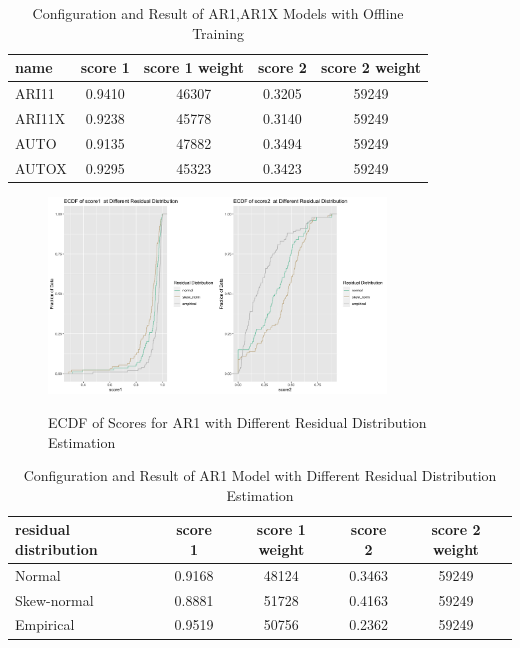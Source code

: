 \documentclass{article}
\begin{document}
\begin{table}[htbp]
  \begin{center}
    \caption{Configuration and Result of AR1,AR1X Models with Offline Training}
    \label{tab:tab1.3.2}
    \begin{tabular}{l|*{4}{c}}
      \textbf{name} & \textbf{score 1} & \textbf{score 1 weight} & \textbf{score 2} & \textbf{score 2 weight} \\
      \hline
      ARI11 & 0.9410 & 46307 & 0.3205 & 59249\\
      ARI11X & 0.9238 & 45778 & 0.3140 & 59249\\
      AUTO & 0.9135 & 47882 & 0.3494 & 59249\\
      AUTOX & 0.9295 & 45323 & 0.3423 & 59249\\
    \end{tabular}
  \end{center}
\end{table}

\begin{figure}[htbp]
\caption{ECDF of Scores for AR1 with Different Residual Distribution Estimation}
\centering
\includegraphics[width = 0.8\textwidth]{images/ECDFofscoresatDifferentResidualDistributionOfAR1,840,1,3.png}
\label{fig:fig1.3.3}
\end{figure}

\begin{table}[htbp]
  \begin{center}
    \caption{Configuration and Result of AR1 Model with Different Residual Distribution Estimation}
    \label{tab:tab1.3.3}
    \begin{tabular}{l|*{4}{c}}
      \textbf{residual distribution} & \textbf{score 1} & \textbf{score 1 weight} & \textbf{score 2} & \textbf{score 2 weight} \\
      \hline
      Normal & 0.9168 & 48124 & 0.3463 & 59249\\
      Skew-normal & 0.8881 & 51728 & 0.4163 & 59249\\
      Empirical & 0.9519 & 50756 & 0.2362 & 59249\\
    \end{tabular}
  \end{center}
\end{table}
\end{document}
